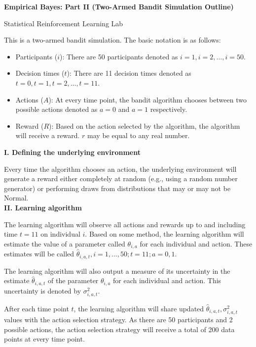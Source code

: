 \documentclass[letterpaper, 11pt]{extarticle}
\begin{document}
\pagestyle{fancy}
\fancyhf{}
\begin{Large}
    \textsf{\textbf{Empirical Bayes: Part II (Two-Armed Bandit Simulation Outline)}}   \par
    Statistical Reinforcement Learning Lab
\end{Large}

\vspace{2ex}

This is a two-armed bandit simulation. The basic notation is as follows: 
\begin{itemize}
    \item Participants ($i$): There are 50 participants denoted as $i=1, i=2, \dots, i=50$.
    \item Decision times ($t$): There are 11 decision times denoted as $t=0, t=1, t=2,\dots,t=11$. 
    \item Actions ($A$): At every time point, the bandit algorithm chooses between two possible actions denoted as $a=0$ and $a=1$ respectively. 
    \item Reward ($R$): Based on the action selected by the algorithm, the algorithm will receive a reward. $r$ may be equal to any real number. 
\end{itemize}

\textsf{\textbf {I. Defining the underlying environment}}

Every time the algorithm chooses an action, the underlying environment will generate a reward either completely at random (e.g., using a random number generator) or performing draws from distributions that may or may not be Normal. \\

\textsf{\textbf {II. Learning algorithm}}

The learning algorithm will observe all  actions and rewards  up to and including time $t=11$ on individual $i$. Based on some method, the learning algorithm will estimate the value of a parameter called $\theta_{i,a}$ for each individual and action. These estimates will be called $\hat{\theta}_{i,a,t}, i=1,...,50; t=11; a=0,1$.

The learning algorithm will also output a measure of its uncertainty in the estimate $\hat{\theta}_{i,a,t}$ of the parameter $\theta_{i,a}$ for each individual and action.  This uncertainty is denoted by $\sigma^2_{i,a,t}$.

After each time point $t$, the learning algorithm will share updated $\hat{\theta}_{i,a,t}, \sigma^2_{i,a,t}$ values with the action selection strategy. As there are 50 participants and 2 possible actions, the action selection strategy will receive a total of 200 data points at every time point.  \\
\end{document}
